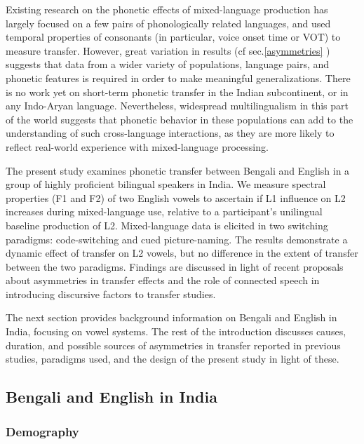 \documentclass[charis,linguex]{glossa}
\begin{document}
Existing research on the phonetic effects of mixed-language production has largely focused on a few pairs of phonologically related languages, and used temporal properties of consonants (in particular, voice onset time or VOT) to measure transfer. However, great variation in results (cf sec.\ref{asymmetries} ) suggests that data from a wider variety of
populations, language pairs,  and phonetic features is required in order to make meaningful generalizations. There is no work yet on short-term phonetic transfer in the Indian subcontinent, or in any Indo-Aryan language. Nevertheless, widespread multilingualism in this part of the world suggests that phonetic
behavior in these populations can add to the understanding of such cross-language interactions, as they are more likely to reflect real-world experience with mixed-language processing.

The present study examines phonetic transfer between Bengali and English in a group of highly proficient bilingual speakers in India. We measure spectral properties (F1 and F2) of two English vowels to ascertain if L1 influence on L2 increases during mixed-language use, relative to a participant's unilingual baseline production of L2. Mixed-language data is elicited in two switching paradigms: code-switching and cued picture-naming. The results demonstrate a dynamic effect of transfer on L2 vowels, but no difference in the extent of transfer between the two paradigms. Findings are discussed in light of recent proposals about asymmetries in transfer effects and the role of connected speech in introducing discursive factors to transfer studies.


The next section provides background information on Bengali and English in India, focusing on vowel systems. The rest of the introduction  discusses causes, duration, and possible sources of asymmetries in transfer reported in previous studies, paradigms used, and the design of the present study in light of these. 


\subsection{Bengali and English in India}

\subsubsection{Demography} 
\end{document}
